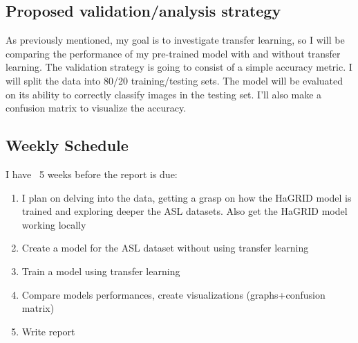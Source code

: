 \documentclass[12pt]{article}
\begin{document}
\subsection*{Proposed validation/analysis strategy}
    As previously mentioned, my goal is to investigate transfer learning, so I will be comparing the performance of my pre-trained model with and without transfer learning. 
    The validation strategy is going to consist of a simple accuracy metric. I will split the data into 80/20 training/testing sets. 
    The model will be evaluated on its ability to correctly classify images in the testing set. I'll also make a
    confusion matrix to visualize the accuracy. 
    
\subsection*{Weekly Schedule}
    I have ~5 weeks before the report is due:
    \begin{enumerate}
        \item I plan on delving into the data, getting a grasp on how the HaGRID model is trained and exploring deeper the ASL datasets. Also get the HaGRID model working locally
        \item Create a model for the ASL dataset without using transfer learning
        \item Train a model using transfer learning
        \item Compare models performances, create visualizations (graphs+confusion matrix)
        \item Write report
    \end{enumerate}
\end{document}

